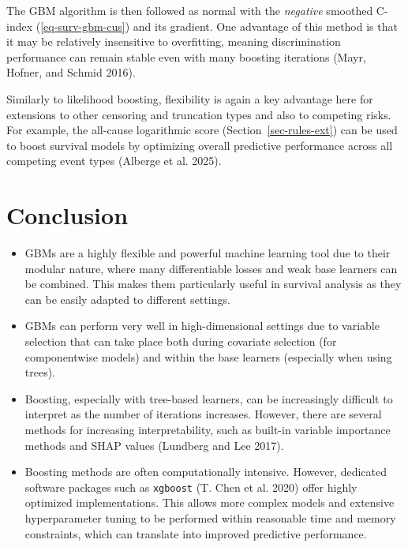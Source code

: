 \documentclass[
  letterpaper,
  krantz2]{style/krantz}
\providecommand{\tightlist}{%
  \setlength{\itemsep}{0pt}\setlength{\parskip}{0pt}}
\begin{document}
The GBM algorithm is then followed as normal with the \emph{negative}
smoothed C-index (\ref{eq-surv-gbm-cus}) and its gradient. One advantage
of this method is that it may be relatively insensitive to overfitting,
meaning discrimination performance can remain stable even with many
boosting iterations (Mayr, Hofner, and Schmid 2016).

Similarly to likelihood boosting, flexibility is again a key advantage
here for extensions to other censoring and truncation types and also to
competing risks. For example, the all-cause logarithmic score
(Section~\ref{sec-rules-ext}) can be used to boost survival models by
optimizing overall predictive performance across all competing event
types (Alberge et al.
2025).

\section{Conclusion}\label{conclusion-11}

\begin{tcolorbox}[enhanced jigsaw, toprule=.15mm, bottomtitle=1mm, opacityback=0, breakable, leftrule=.75mm, title={Key takeaways}, toptitle=1mm, bottomrule=.15mm, colback=white, colframe=quarto-callout-warning-color-frame, titlerule=0mm, opacitybacktitle=0.6, coltitle=black, rightrule=.15mm, left=2mm, colbacktitle=quarto-callout-warning-color!10!white, arc=.35mm]

\begin{itemize}
\tightlist
\item
  GBMs are a highly flexible and powerful machine learning tool due to
  their modular nature, where many differentiable losses and weak base
  learners can be combined. This makes them particularly useful in
  survival analysis as they can be easily adapted to different settings.
\item
  GBMs can perform very well in high-dimensional settings due to
  variable selection that can take place both during covariate selection
  (for componentwise models) and within the base learners (especially
  when using trees).
\item
  Boosting, especially with tree-based learners, can be increasingly
  difficult to interpret as the number of iterations increases. However,
  there are several methods for increasing interpretability, such as
  built-in variable importance methods and SHAP values (Lundberg and Lee
  2017).
\item
  Boosting methods are often computationally intensive. However,
  dedicated software packages such as \texttt{xgboost} (T. Chen et al.
  2020) offer highly optimized implementations. This allows more complex
  models and extensive hyperparameter tuning to be performed within
  reasonable time and memory constraints, which can translate into
  improved predictive performance.
\end{itemize}

\end{tcolorbox}
\end{document}
